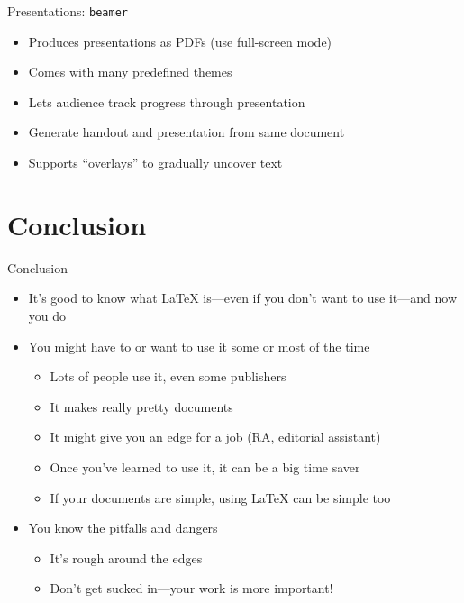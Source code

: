 \begin{frame}{Presentations: \texttt{beamer}}

\begin{itemize}[<+->]
\item Produces presentations as PDFs (use full-screen mode)
\item Comes with many predefined themes
\item Lets audience track progress through presentation
\item Generate handout and presentation from same document
\item Supports ``overlays'' to gradually uncover text
\end{itemize}

\end{frame}

\section{Conclusion}

\begin{frame}{Conclusion}

\begin{itemize}
\item It's good to know what \LaTeX{} is---even if you don't want to
  use it---and now you do
\item You might have to or want to use it some or most of the time 
\begin{itemize}
\item Lots of people use it, even some publishers
\item It makes really pretty documents
\item It might give you an edge for a job (RA, editorial assistant)
\item Once you've learned to use it, it can be a big time saver
\item If your documents are simple, using \LaTeX{} can be simple too 
\end{itemize}
\item You know the pitfalls and dangers
\begin{itemize}
\item It's rough around the edges
\item Don't get sucked in---your work is more important!
\end{itemize}
\end{itemize}
\end{frame}

